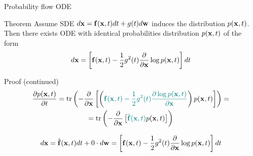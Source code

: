 \begin{frame}{Probability flow ODE}
	\begin{block}{Theorem}
		Assume SDE $d\mathbf{x} = \mathbf{f}(\mathbf{x}, t) dt + g(t) d \mathbf{w}$ induces the distribution $p(\mathbf{x}, t)$.
		Then there exists ODE with identical probabilities distribution $p(\mathbf{x}, t)$ of the form
		\vspace{-0.3cm}
		\[
			d\mathbf{x} = \left[\mathbf{f}(\mathbf{x}, t) -\frac{1}{2} g^2(t) \frac{\partial}{\partial \mathbf{x}} \log p(\mathbf{x}, t) \right] dt
		\]
		\vspace{-0.7cm}
	\end{block}
	\begin{block}{Proof (continued)}
 		\vspace{-0.7cm}
 		\begin{multline*}
 			\frac{\partial p(\mathbf{x}, t)}{\partial t} =  \text{tr}\left(- \frac{\partial}{\partial \mathbf{x}} \left[ \left( {\color{teal}\mathbf{f}(\mathbf{x}, t) - \frac{1}{2} g^2(t) \frac{\partial \log p(\mathbf{x}, t)}{\partial \mathbf{x}}}\right) p(\mathbf{x}, t) \right]  \right) =\\
 			  =  \text{tr}\left(- \frac{\partial}{\partial \mathbf{x}} \left[ {\color{teal}\tilde{\mathbf{f}}(\mathbf{x}, t)} p(\mathbf{x}, t) \right]  \right)
 		\end{multline*}
 	\end{block}
 	\vspace{-1.0cm}
 	\[
 		d \mathbf{x} = \tilde{\mathbf{f}}(\mathbf{x}, t) dt + 0 \cdot d \mathbf{w} = \left[\mathbf{f}(\mathbf{x}, t) -\frac{1}{2} g^2(t) \frac{\partial}{\partial \mathbf{x}} \log p(\mathbf{x}, t) \right] dt
 	\]
\end{frame}
